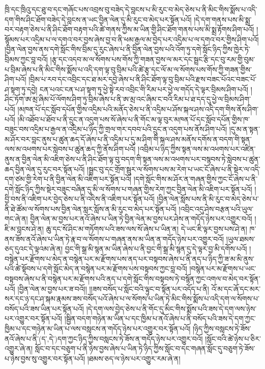 ཁྲི་དང་ཁྲིའུ་དང་ཐུ་བ་དང་གཞོང་པས་འབྲས་བུ་བཟེད་དེ་བླངས་པ་མི་རུང་བ་མེད་ཅེས་པ་ནི་མིང་གིས་སྨོས་པ་འདི་དག་གིས་ཤིང་ཐོག་བཟེད་དེ་བླངས་ན་ཡང་བྱིན་ལེན་དུ་མི་རུང་བ་མེད་པར་སྟོན་པའོ། །དེ་དག་གནས་པས་མི་སྨྲ་བར་བརྟག་ཅེས་པ་ནི་ཤིང་ཐོག་བརྟག་པའི་ཚེ་གནས་ཀྱིས་མ་ཡིན་གྱི་ཤིང་ཐོག་གནས་པས་མི་སྨྲ་རྟོགས་ཤིག་པའོ། །སྙོམས་པར་འདྲིམ་པ་ལ་དགའ་བར་བྱས་ཞེས་བྱ་བ་ནི་ཕམ་རྒྱལ་མ་བྱེད་པར་འདྲིམ་པ་ལ་དགའ་བར་གྱིས་ཤིག་པའོ། །བྱིན་ལེན་བྱས་ནས་དགེ་སློང་གིས་བྲིམ་དུ་རུང་ཞེས་པ་ནི་བྱིན་ལེན་བྱས་པའི་འོག་ཏུ་དགེ་སློང་ཉིད་ཀྱིས་ཁྱེར་ཏེ་བྲིམས་ཀྱང་བླ་བའོ། །རྩྭ་དང་འདབ་མ་ལ་སོགས་པས་གོས་ཀྱི་གཟན་བྱས་ལ་མར་དང་སྦྲང་རྩི་དང་བུ་རམ་གྱི་བུམ་པ་བྲིམ་ཞེས་པ་ནི་མིང་གིས་སྨོས་པ་འདི་དག་ལྟ་བུ་བྲིམ་པའི་ཚེ་རྩྭ་དང་ལོ་མ་ལ་སོགས་པས་གོས་ཀྱི་གཟན་གྱིས་ཤིག་པའོ། །བྲིམ་པ་རབ་དང་འབྲིང་དང་ཐ་མར་དབྱེ་ཞེས་པ་ནི་ཤིང་ཐོག་ལྟ་བུ་བྲིམ་པའི་རྫས་བཟང་པོའང་བཟང་པོ་ཤ་སྟག་ཏུ་དབྱེ། ངན་པའང་ངན་པ་ཤ་སྟག་ཏུ་ཕྱེ་སྟེ་རབ་འབྲིང་གི་རིམ་པར་ཕྱེ་ལ་གདོད་དེ་ལྟར་བྲིམས་ཤིག་པའོ། །ཤིང་ཏོག་ཨ་མྲ་ཞིམ་པོ་ལོགས་ཤིག་ཏུ་བྲིམ་ཞེས་པ་ནི་ཨ་མྲ་འང་ཞིམ་ང་བའི་རིམ་པ་ཐ་དད་དུ་ཕྱེ་ལ་བྲིམས་ཤིག་པའོ། །མཁན་པོ་དང་སློབ་དཔོན་གྱིས་འདྲིམ་པའི་མནོད་ཅེས་པ་ནི་འདྲིམ་པ་ཤོས་སྐལ་ཤས་འདི་དག་གིས་ནོས་ཤིག་པའོ། །མི་འཐོབ་པ་ཐོབ་པ་ནི་དྲུང་ན་འདུག་པས་སོ་ཞེས་པ་ནི་གོང་མ་ལྟ་བུར་མཁན་པོ་དང་སློབ་དཔོན་གྱིས་ཁ་བཟུང་བས་འདྲིམ་པ་རྒྱལ་ན་འདྲིམ་པ་ཉིད་ཀྱི་གྲལ་གར་དབབ་པའི་དྲུང་ན་འདུག་པས་ནོས་ཤིག་པའོ། །དུ་མ་ན་སྟན་མ་ཤོར་བར་བླང་ནུས་པ་ཚུན་ཆད་དོ་ཞེས་པ་ནི་འདྲིམ་པ་དུ་མ་ཤིག་གི་སྐལ་ཤས་མནོས་དགོས་ན་བདག་གི་སྟན་ལས་མ་འཕགས་པར་སླེབས་པ་ཚུན་ཆད་ཀྱི་ནོས་ཤིག་པའོ། །འབྲིམ་པ་ཉིད་ཀྱིས་སྟན་ལས་མ་འཕགས་པར་འཛིན་ནུས་ན་བྱིན་ལེན་མི་འཇིག་ཅེས་པ་ནི་ཤིང་ཐོག་ལྟ་བུ་བདག་གི་སྟན་ལས་མ་འཕགས་པར་བསྙབས་ཏེ་སླེབས་པ་ཚུན་ཆད་བྱིན་ལེན་དུ་རུང་བར་སྟོན་པའོ། །སྦྲང་བུ་དང་གྲོག་སྦུར་ལ་སོགས་པས་མ་རེག་པ་ཡང་ངོ་ཞེས་པ་ནི་སྡེར་ལ་འདི་དག་ཙམ་གྱི་རེག་པ་ནི་བྱིན་ལེན་མི་འཇིག་པར་སྟོན་པའོ། །དགེ་སློང་གིས་མ་ཤོར་ན་གཞན་གྱིས་ཀྱང་ངོ་ཞེས་པ་ནི་དགེ་སློང་ཉིད་ཀྱིས་སྡེར་བཟུང་བཞིན་དུ་མི་ལ་སོགས་པ་གཞན་གྱིས་རེག་ཀྱང་བྱིན་ལེན་མི་འཇིག་པར་སྟོན་པའོ། །བྱི་བས་ནི་འཇིག་པར་བྱེད་ཅེས་པ་ནི་འདིས་ནི་འཇིག་པར་སྟོན་པའོ། །བྱིན་ལེན་སློས་པས་ནི་མི་རུང་བ་མེད་ཅེས་པ་ནི་ཐེ་ཚོམ་ལ་སོགས་པས་བྱིན་ལེན་སླར་སློས་ན་མི་རུང་བ་མེད་པར་སྟོན་པའོ། །འབྲིང་འདུ་ཤེས་བརྩན་པའི་ཡུལ་གང་ཞེ་ན། བྱིན་ལེན་མ་བྱས་པར་ནའོ་ཞེས་པ་ཡིན་ཏེ་བྱིན་ལེན་མ་བྱས་པར་ཤེས་ན་གདོད་ཉེས་པར་འགྱུར་བའོ། །ཇི་མ་བླངས་ཤེ་ན། ཆུ་དང་སོ་ཤིང་མ་གཏོགས་པའི་ཟས་ལས་སོ་ཞེས་པ་ཡིན་ན། དེ་ཡང་ཇི་ལྟར་བྱས་པས་ཤེ་ན། ཁ་ནས་ཟོས་ནའོ་ཞེས་པ་ཡིན་ཏེ་རྣ་བ་ལ་སོགས་པ་གཞན་ནས་མ་ཡིན་ན་གདོད་ཉེས་པར་འགྱུར་བའོ། །ཡུལ་ཐམས་ཅད་དུའང་དེ་ལྟའམ་ཞེ་ན། བྱང་གི་སྒྲ་མི་སྙན་མ་ཡིན་ཞེས་པ་ནི་བྱང་གི་སྒྲ་མི་སྙན་དུ་དེ་ལྟར་བྱ་མི་དགོས་པའོ། །བསྙེན་པར་རྫོགས་པ་མེད་ན་བསྙེན་པར་མ་རྫོགས་པས་ནད་པར་བསྟབས་ཞེས་པ་ནི་ནད་པ་ཉིད་ཀྱི་ཟ་མ་མི་ནུས་པའི་ཚེ་སྟོབས་པ་དགེ་སློང་མེད་ན་བསྙེན་པར་མ་རྫོགས་པས་བསྟབས་ཀྱང་བླ་བའོ། །བསྙེན་པར་མ་རྫོགས་པ་ཡང་བསྟབས་ཞེས་པ་ནི་བསྙེན་པར་མ་རྫོགས་པའི་ནད་པ་དགེ་སློང་གིས་བསྟབས་ཏེ་བསྙོན་ཀྱང་འགལ་བ་མེད་བར་སྟོན་པའོ། །བྱིན་ལེན་མ་བྱས་པར་ཟ་བའོ།། །།ཟས་བསོད་པ་སློང་བའི་ལྟུང་བ་སྟོན་པར་འདོད་པ་ནི། འོ་མ་དང་ཞོ་དང་མར་སར་དང་ཉ་དང་ཤ་སྐམ་རྣམས་ཟས་བསོད་པའོ་ཞེས་པ་ལ་སོགས་པ་ཡིན་ཏེ་མིང་གིས་སྨོས་པ་འདི་དག་ལ་སོགས་པ་བསོད་པའི་ཟས་ཡིན་པར་སྟོན་པའོ། །དེ་དག་ལས་བྱེད་ཅེས་པ་ནི་གོང་དུ་མིང་གིས་སྨོས་པའི་ཟས་དེ་དག་ལས་ཉེས་པར་འགྱུར་བར་སྟོན་པའོ། །སྦྱིན་བདག་གཉེན་མ་ཡིན་པ་དང་ཁྱིམ་པ་ནའོ་ཞེས་པ་ནི་བསོད་པའི་ཟས་དེ་དག་ཀྱང་ཁྱིམ་པ་དང་གཉེན་མ་ཡིན་པ་ལས་བསླངས་ན་གདོད་ཉེས་པར་འགྱུར་བར་སྟོན་པའོ། །ཉིད་ཀྱིས་བསླངས་ཏེ་ཟོས་ནའོ་ཞེས་པ་ནི་(ད་‚དེ་)དག་ཀྱང་ཉིད་ཀྱིས་བསླངས་ཏེ་ཟོས་ན་གདོད་ཉེས་པར་འགྱུར་བའོ། །སློང་བའི་ཚེ་ཉེས་པ་ཅིར་འགྱུར་ཞེ་ན། སློང་བ་དང་བཅུག་པ་ནི་ཉེས་བྱས་ཞེས་པ་ཡིན་ཏེ་ཉིད་ཀྱིས་སློང་བ་དང་གཞན་སློང་དུ་བཅུག་ཏེ་ཟོས་པ་ཉེས་བྱས་སུ་འགྱུར་བར་སྟོན་པའོ། །ཐམས་ཅད་ལ་ཉེས་པར་འགྱུར་རམ་ཞེ་ན། 